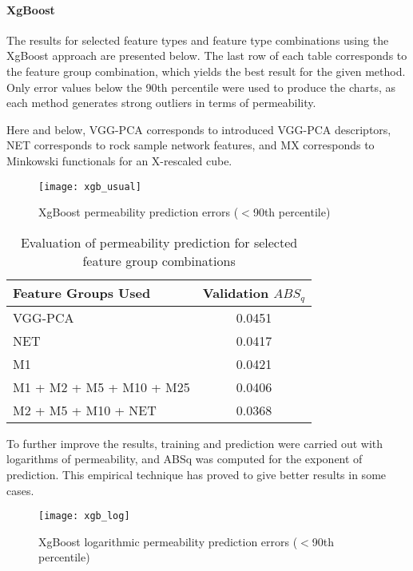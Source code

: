 \documentclass[review]{elsarticle}
\begin{document}
\paragraph{XgBoost}

The results for selected feature types and feature type combinations using the XgBoost approach are presented below. The last row of each table corresponds to the feature group combination, which yields the best result for the given method. Only error values below the 90th percentile were used to produce the charts, as each method generates strong outliers in terms of permeability.

Here and below, VGG-PCA corresponds to introduced VGG-PCA descriptors, NET corresponds to rock sample network features, and MX corresponds to Minkowski functionals for an X-rescaled cube.

\begin{figure}[H]
    \centering
    \texttt{[image: xgb\_usual]}
    \caption{XgBoost permeability prediction errors ($<$90th percentile)}
\end{figure}

\begin{table}[H]
  \centering
  \caption{Evaluation of permeability prediction for selected feature group combinations} \label{tab:tab3}
  \begin{tabular}{ | l | c | }
    \hline
    Feature Groups Used & Validation $ABS_q$ \\ \hline
    VGG-PCA & 0.0451 \\ \hline
    NET & 0.0417 \\ \hline
    M1 & 0.0421 \\ \hline
    M1 + M2 + M5 + M10 + M25 & 0.0406 \\ \hline
    M2 + M5 + M10 + NET & 0.0368 \\ \hline
  \end{tabular}
\end{table}

To further improve the results, training and prediction were carried out with logarithms of permeability, and ABSq was computed for the exponent of prediction. This empirical technique has proved to give better results in some cases.

\begin{figure}[H]
    \centering
    \texttt{[image: xgb\_log]}
    \caption{XgBoost logarithmic permeability prediction errors ($<$90th percentile)}
\end{figure}
\end{document}
